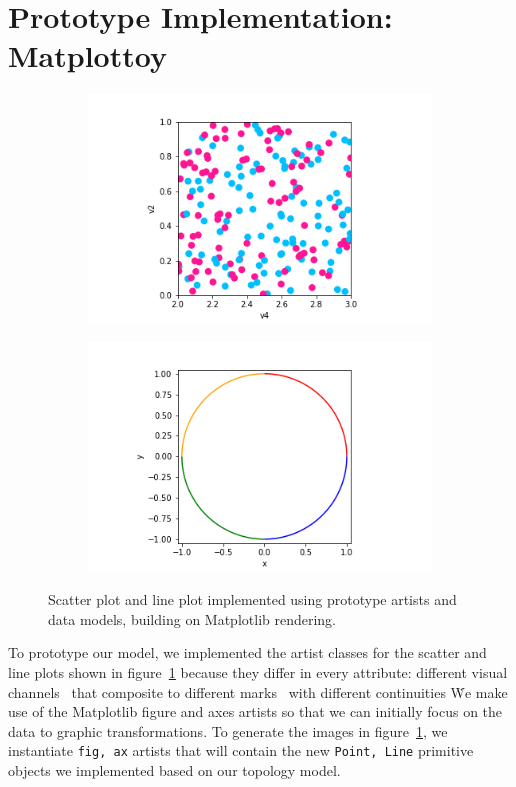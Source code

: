 \documentclass[../main.tex]{subfiles}
\begin{document}
\section{Prototype Implementation: Matplottoy}
\label{sec:implementation}
\begin{figure}[H]
    \begin{subfigure}{0.5\textwidth}
        \includegraphics[width=\textwidth]{figures/code/scatter_0.png}
    \end{subfigure}
    \begin{subfigure}{0.5\textwidth}
        \includegraphics[width=\textwidth]{figures/code/line_1.png}
    \end{subfigure}
    \caption{Scatter plot and line plot implemented using prototype artists and data models, building on Matplotlib rendering.}
    \label{fig:code_scatter_line}
\end{figure}
To prototype our model, we implemented the artist classes for the scatter and line plots shown in figure~\ref{fig:code_scatter_line} because they differ in every attribute: different visual channels \vchannel\ that composite to different marks \vmark\ with different continuities \vindex\.  We make use of the Matplotlib figure and axes artists \cite{hunterArchitectureOpenSource,hunterMatplotlib2DGraphics2007} so that we can initially focus on the data to graphic transformations. 
To generate the images in figure~\ref{fig:code_scatter_line}, we instantiate \texttt{fig, ax} artists that will contain the new \texttt{Point, Line} primitive objects we implemented based on our topology model. 
\end{document}
